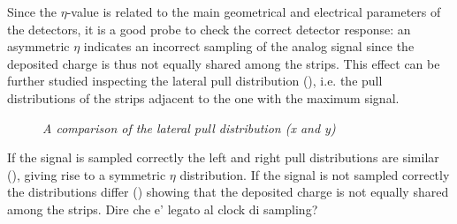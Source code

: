 Since the $\eta$-value is related to the main geometrical and electrical
parameters of the detectors, it is a good probe to check the correct detector
response: an asymmetric $\eta$ indicates an incorrect sampling of the analog
signal since the deposited charge is thus not equally shared among the
strips. This effect can be further studied inspecting the lateral pull
distribution (), i.e. the pull distributions of the
strips adjacent to the one with the maximum signal.
\begin{figure}[!htbp]
  \centering 
  \caption{\textit{\color{red}A comparison of the lateral pull distribution (x and y) }}
  \label{fig:pull_laterale}
\end{figure}
If the signal is sampled correctly the left and right pull distributions are
similar (), giving rise to a symmetric $\eta$
distribution. If the signal is not sampled correctly the distributions differ ()
showing that the deposited charge is not equally shared among the
strips. {\color{red}Dire che e' legato al clock di sampling?}




